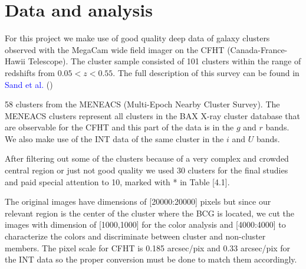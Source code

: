 \chapter{Data and analysis}

For this project we make use of good quality deep data of galaxy clusters observed with the MegaCam wide field imager on the CFHT (Canada-France-Hawii Telescope). The cluster sample consisted of 101 clusters within the range of redshifts from $0.05<z<0.55$. The full description of this survey can be found in \textcolor{blue}{Sand et al.} (\citeyear{Reference11})

58 clusters from the MENEACS (Multi-Epoch Nearby Cluster Survey). The MENEACS clusters represent all clusters in the BAX X-ray cluster database that are observable for the CFHT and this part of the data is in the $g$ and $r$ bands. We also make use of the INT data of the same cluster in the $i$ and $U$ bands. 

After filtering out some of the clusters because of a very complex and crowded central region or just not good quality we used 30 clusters for the final studies and paid special attention to 10, marked with * in Table [4.1].

The original images have dimensions of [20000:20000] pixels but since our relevant region is the center of the cluster where the BCG is located, we cut the images with dimension of [1000,1000] for the color analysis and [4000:4000] to characterize the colors and discriminate between cluster and non-cluster members. The pixel scale for CFHT is 0.185 arcsec/pix and 0.33 arcsec/pix for the INT data so the proper conversion must be done to match them accordingly.

